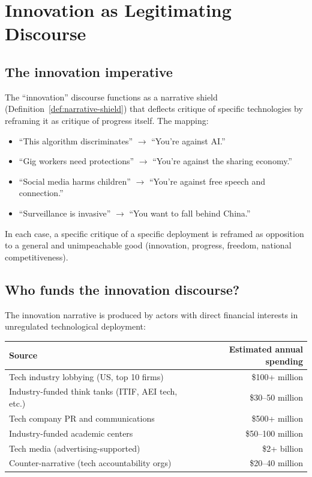 \section{Innovation as Legitimating Discourse}
\label{sec:ch28-innovation}

\subsection{The innovation imperative}

\begin{proposition}
\label{prop:innovation-shield}
The ``innovation'' discourse functions as a narrative shield (Definition~\ref{def:narrative-shield}) that deflects critique of specific technologies by reframing it as critique of progress itself.
The mapping:
\begin{itemize}[nosep]
  \item ``This algorithm discriminates'' $\to$ ``You're against AI.''
  \item ``Gig workers need protections'' $\to$ ``You're against the sharing economy.''
  \item ``Social media harms children'' $\to$ ``You're against free speech and connection.''
  \item ``Surveillance is invasive'' $\to$ ``You want to fall behind China.''
\end{itemize}
In each case, a specific critique of a specific deployment is reframed as opposition to a general and unimpeachable good (innovation, progress, freedom, national competitiveness).
\end{proposition}

\subsection{Who funds the innovation discourse?}

The innovation narrative is produced by actors with direct financial interests in unregulated technological deployment:

\begin{center}
\begin{tabular}{lr}
\toprule
Source & Estimated annual spending \\
\midrule
Tech industry lobbying (US, top 10 firms) & \$100+ million \\
Industry-funded think tanks (ITIF, AEI tech, etc.) & \$30--50 million \\
Tech company PR and communications & \$500+ million \\
Industry-funded academic centers & \$50--100 million \\
Tech media (advertising-supported) & \$2+ billion \\
\midrule
Counter-narrative (tech accountability orgs) & \$20--40 million \\
\bottomrule
\end{tabular}
\end{center}

